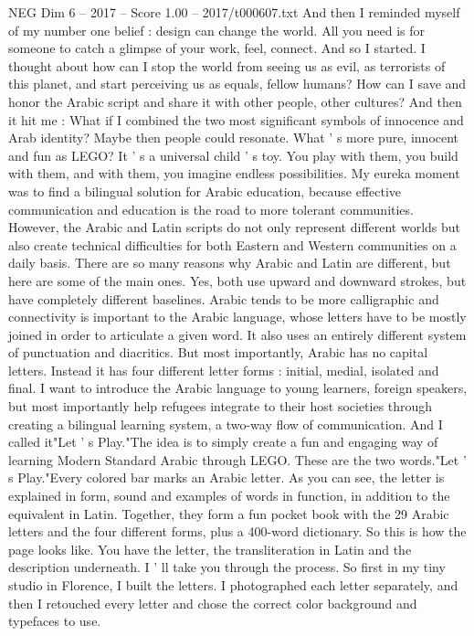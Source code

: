 \begin{textsample}{NEG Dim 6 – 2017 – Score 1.00 – 2017/t000607.txt}
And then I reminded myself of my number one belief : design can change the world.
All you need is for someone to catch a glimpse of your work, feel, connect.
And so I started.
I thought about how can I stop the world from seeing us as evil, as terrorists of this planet, and start perceiving us as equals, fellow humans?
How can I save and honor the Arabic script and share it with other people, other cultures?
And then it hit me : What if I combined the two most significant symbols of innocence and Arab identity?
Maybe then people could resonate.
What ' s more pure, innocent and fun as LEGO?
It ' s a universal child ' s toy.
You play with them, you build with them, and with them, you imagine endless possibilities.
My eureka moment was to find a bilingual solution for Arabic education, because effective communication and education is the road to more tolerant communities.
However, the Arabic and Latin scripts do not only represent different worlds but also create technical difficulties for both Eastern and Western communities on a daily basis.
There are so many reasons why Arabic and Latin are different, but here are some of the main ones.
Yes, both use upward and downward strokes, but have completely different baselines.
Arabic tends to be more calligraphic and connectivity is important to the Arabic language, whose letters have to be mostly joined in order to articulate a given word.
It also uses an entirely different system of punctuation and diacritics.
But most importantly, Arabic has no capital letters.
Instead it has four different letter forms : initial, medial, isolated and final.
I want to introduce the Arabic language to young learners, foreign speakers, but most importantly help refugees integrate to their host societies through creating a bilingual learning system, a two-way flow of communication.
And I called it"Let ' s Play."The idea is to simply create a fun and engaging way of learning Modern Standard Arabic through LEGO.
These are the two words."Let ' s Play."Every colored bar marks an Arabic letter.
As you can see, the letter is explained in form, sound and examples of words in function, in addition to the equivalent in Latin.
Together, they form a fun pocket book with the 29 Arabic letters and the four different forms, plus a 400-word dictionary.
So this is how the page looks like.
You have the letter, the transliteration in Latin and the description underneath.
I ' ll take you through the process.
So first in my tiny studio in Florence, I built the letters.
I photographed each letter separately, and then I retouched every letter and chose the correct color background and typefaces to use.

\end{textsample}

